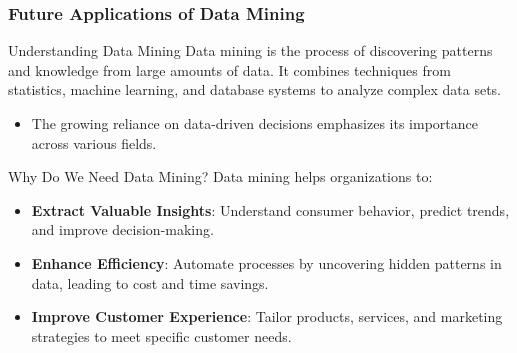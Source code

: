 \documentclass[aspectratio=169]{beamer}
\begin{document}
\begin{frame}[fragile]
    \frametitle{Future Applications of Data Mining}
    \begin{block}{Understanding Data Mining}
        Data mining is the process of discovering patterns and knowledge from large amounts of data. It combines techniques from statistics, machine learning, and database systems to analyze complex data sets. 
        \begin{itemize}
            \item The growing reliance on data-driven decisions emphasizes its importance across various fields.
        \end{itemize}
    \end{block}

    \begin{block}{Why Do We Need Data Mining?}
        Data mining helps organizations to:
        \begin{itemize}
            \item \textbf{Extract Valuable Insights}: Understand consumer behavior, predict trends, and improve decision-making.
            \item \textbf{Enhance Efficiency}: Automate processes by uncovering hidden patterns in data, leading to cost and time savings.
            \item \textbf{Improve Customer Experience}: Tailor products, services, and marketing strategies to meet specific customer needs.
        \end{itemize}
    \end{block}
\end{frame}
\end{document}
